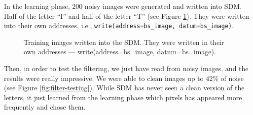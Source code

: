 In the learning phase, 200 noisy images were generated and written into SDM. Half of the letter ``I'' and half of the letter ``T'' (see Figure \ref{fig:filter-training}). They were written into their own addresses, i.e., \lstinline{write(address=bs_image, datum=bs_image)}.

\begin{figure}[!htb]


  \caption{Training images written into the SDM. They were written in their own addresses --- write(address=bs\_image, datum=bs\_image).}
  \label{fig:filter-training}
\end{figure}

Then, in order to test the filtering, we just have read from noisy images, and the results were really impressive. We were able to clean images up to 42\% of noise (see Figure \ref{fig:filter-testing}). While SDM has never seen a clean version of the letters, it just learned from the learning phase which pixels has appeared more frequently and chose them.

